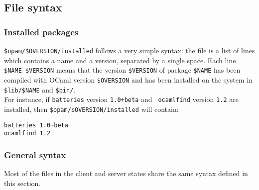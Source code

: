\documentclass[a4paper,11pt]{article}
\begin{document}
\subsection{File syntax}

\subsubsection{Installed packages}
\label{installed}

\verb+$opam/$OVERSION/installed+ follows a very simple syntax: the
file is a list of lines which contains a name and a version, separated
by a single space. Each line \verb+$NAME $VERSION+ means that the
version \verb+$VERSION+ of package \verb+$NAME+ has been compiled with
OCaml version \verb+$OVERSION+ and has been installed on the system in
\verb+$lib/$NAME+ and \verb+$bin/+. \\

For instance, if {\tt batteries} version {\tt 1.0+beta} and {\tt
  ocamlfind} version {\tt 1.2} are installed, then
\verb+$opam/$OVERSION/installed+ will contain:

{\small
\begin{Verbatim}[frame=single]
batteries 1.0+beta
ocamlfind 1.2
\end{Verbatim}
}

\subsubsection{General syntax}
\label{syntax}

Most of the files in the client and server states share the same
syntax defined in this section.
\end{document}
